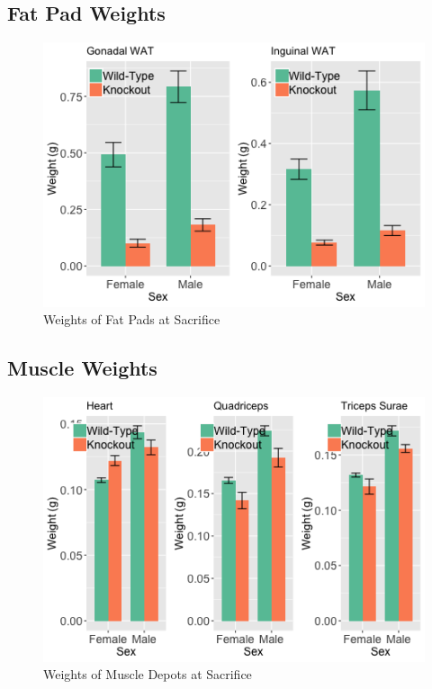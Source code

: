 \documentclass[]{article}
\begin{document}
\subsection{Fat Pad Weights}\label{fat-pad-weights}

\begin{figure}
\centering
\includegraphics{figures/wat-weights-1.png}
\caption{Weights of Fat Pads at Sacrifice}
\end{figure}

\subsection{Muscle Weights}\label{muscle-weights}

\begin{figure}
\centering
\includegraphics{figures/muscle-weights-1.png}
\caption{Weights of Muscle Depots at Sacrifice}
\end{figure}
\end{document}
